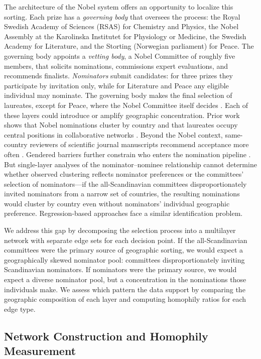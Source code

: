 \documentclass[12pt]{article}
\begin{document}
The architecture of the Nobel system offers an opportunity to localize this sorting. Each prize has a \emph{governing body} that oversees the process: the Royal Swedish Academy of Sciences (RSAS) for Chemistry and Physics, the Nobel Assembly at the Karolinska Institutet for Physiology or Medicine, the Swedish Academy for Literature, and the Storting (Norwegian parliament) for Peace. The governing body appoints a \emph{vetting body}, a Nobel Committee of roughly five members, that solicits nominations, commissions expert evaluations, and recommends finalists. \emph{Nominators} submit candidates: for three prizes they participate by invitation only, while for Literature and Peace any eligible individual may nominate. The governing body makes the final selection of laureates, except for Peace, where the Nobel Committee itself decides \cite{methods}. Each of these layers could introduce or amplify geographic concentration. Prior work shows that Nobel nominations cluster by country \cite{GalDom2019} and that laureates occupy central positions in collaborative networks \cite{WagHorWhe2015}. Beyond the Nobel context, same-country reviewers of scientific journal manuscripts recommend acceptance more often \cite{ZumTep2025}. Gendered barriers further constrain who enters the nomination pipeline \cite{ModGilSha2018, LunJenJau2019}. But single-layer analyses of the nominator--nominee relationship \cite{GalDom2019} cannot determine whether observed clustering reflects nominator preferences or the committees' selection of nominators---if the all-Scandinavian committees disproportionately invited nominators from a narrow set of countries, the resulting nominations would cluster by country even without nominators' individual geographic preference. Regression-based approaches \cite{KoJanYan2024} face a similar identification problem.

We address this gap by decomposing the selection process into a multilayer network \cite{Kivela2014} with separate edge sets for each decision point. If the all-Scandinavian committees were the primary source of geographic sorting, we would expect a geographically skewed nominator pool: committees disproportionately inviting Scandinavian nominators. If nominators were the primary source, we would expect a diverse nominator pool, but a concentration in the nominations those individuals make. We assess which pattern the data support by comparing the geographic composition of each layer and computing homophily ratios for each edge type.

\subsection*{Network Construction and Homophily Measurement}
\end{document}
